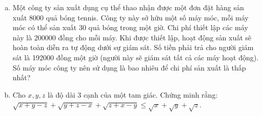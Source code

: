 \begin{ex} %
	\begin{enumerate}[a)]
		\item Một công ty sản xuất dụng cụ thể thao nhận được một đơn đặt hàng sản xuất 8000 quả bóng tennis. Công ty này sở hữu một số máy móc, mỗi máy móc có thể sản xuất 30 quả bóng trong một giờ. Chi phí thiết lập các máy này là 200000 đồng cho mỗi máy. Khi được thiết lập, hoạt động sản xuất sẽ hoàn toàn diễn ra tự động dưới sự giám sát. Số tiền phải trả cho người giám sát là 192000 đồng một giờ (người này sẽ giám sát tất cả các máy hoạt động). Số máy móc công ty nên sử dụng là bao nhiêu để chi phí sản xuất là thấp nhất?
		\item Cho $x, y, z$ là độ dài 3 cạnh của một tam giác. Chứng minh rằng:
		$\sqrt{x+y-z} + \sqrt{y+z-x} + \sqrt{z+x-y} \le \sqrt{x} + \sqrt{y} + \sqrt{z}$.
	\end{enumerate}
	\loigiai{}
\end{ex}

